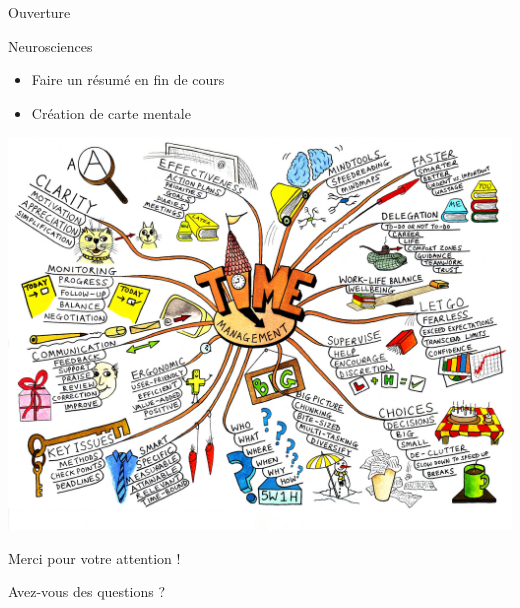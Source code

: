 \begin{frame}{Ouverture}
  \vfill
    \begin{block}{Neurosciences}
    \begin{itemize}
    \item Faire un résumé en fin de cours
    \item Création de carte mentale
    \end{itemize}
  \end{block}
  \vfill
  \begin{center}
    \includegraphics[width=.6\textwidth]{../resources/illustrations/mindmap.jpg}
  \end{center}
    \vfill
\end{frame}

\begin{frame}
\Huge
\begin{center}
	Merci pour votre attention !
	
	Avez-vous des questions ?
\end{center}
\end{frame}

